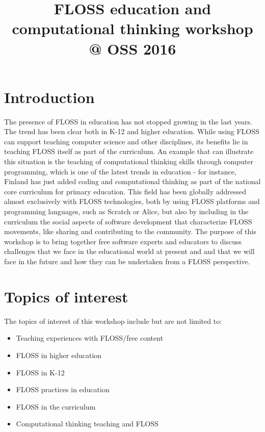 \documentclass[a4paper,10pt]{article}
\title{FLOSS education and computational thinking workshop @ OSS 2016}
\author{}
\date{}
\begin{document}
\maketitle


\section*{Introduction}
The presence of FLOSS in education has not stopped growing in the last years. The trend has been clear both in K-12 and higher education. While using FLOSS can support teaching computer science and other disciplines, its benefits lie in teaching FLOSS itself as part of the curriculum. An example that can illustrate this situation is the teaching of computational thinking skills through computer programming, which is one of the latest trends in education - for instance, Finland has just added coding and computational thinking as part of the national core curriculum for primary education. This field has been globally addressed almost exclusively with FLOSS technologies, both by using FLOSS platforms and programming languages, such as Scratch or Alice, but also by including in the curriculum the social aspects of software development that characterize FLOSS movements, like sharing and contributing to the community. The purpose of this workshop is to bring together free software experts and educators to discuss challenges that we face in the educational world at present and and that we will face in the future and how they can be undertaken from a FLOSS perspective.

\section*{Topics of interest}
The topics of interest of this workshop include but are not limited to:
\begin{itemize}
 \item Teaching experiences with FLOSS/free content
 \item FLOSS in higher education 
 \item FLOSS in K-12
 \item FLOSS practices in education 
 \item FLOSS in the curriculum 
 \item Computational thinking teaching and FLOSS
\end{itemize}
\end{document}
